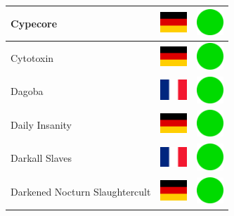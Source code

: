 \documentclass[12pt, a4paper, twoside]{report}
\begin{document}
\begin{center}
\begin{longtable}{|p{5cm}|p{2cm}|p{2cm}|}
 Cypecore                                                   & \includegraphics[width=1cm]{4x3/de} &   \includegraphics[width=1cm]{likes/y} \\ \hline
 Cytotoxin                                                  & \includegraphics[width=1cm]{4x3/de} &   \includegraphics[width=1cm]{likes/y} \\ \hline
 Dagoba                                                     & \includegraphics[width=1cm]{4x3/fr} &   \includegraphics[width=1cm]{likes/y} \\ \hline
 Daily Insanity                                             & \includegraphics[width=1cm]{4x3/de} &   \includegraphics[width=1cm]{likes/y} \\ \hline
 Darkall Slaves                                             & \includegraphics[width=1cm]{4x3/fr} &   \includegraphics[width=1cm]{likes/y} \\ \hline
 Darkened Nocturn Slaughtercult                             & \includegraphics[width=1cm]{4x3/de} &   \includegraphics[width=1cm]{likes/y} \\ \hline

\end{longtable}
\end{center}
\end{document}
